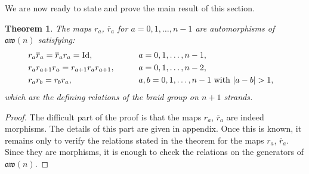 \documentclass[pdftex]{sigma}
\numberwithin{equation}{section}
\newtheorem{theo}{Theorem}[section]
\theoremstyle{definition}
\newcommand{\rb}{\overline{r}}
\newcommand{\aw}{\mathfrak{aw}(n)}
\begin{document}
We are now ready to state and prove the main result of this section.
\begin{theo}\label{theo-matricesR}
The maps $r_a$, $\rb_a$ for $a=0,1,\dots,n-1$ are automorphisms of $\aw$ satisfying:
\begin{alignat*}{3}
&r_a\rb_a=\rb_ar_a={\rm Id} , && a=0,1,\dots,n-1, &\\
&r_ar_{a+1}r_a=r_{a+1}r_ar_{a+1} ,\qquad && a=0,1,\dots,n-2, &\\
&r_ar_b=r_br_a , && a,b=0,1,\dots,n-1\ \text{with}\ |a-b|>1 , &
\end{alignat*}
which are the defining relations of the braid group on $n+1$ strands.
\end{theo}
\begin{proof}
The difficult part of the proof is that the maps $r_a$, $\rb_a$ are indeed morphisms. The details of this part are given in appendix. Once this is known, it remains only to verify the relations stated in the theorem for the maps $r_a$, $\rb_a$. Since they are morphisms, it is enough to check the relations on the generators of $\aw$.


\end{proof}
\end{document}
